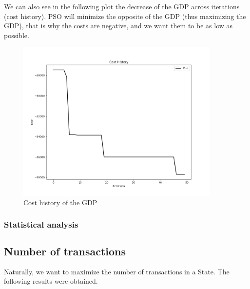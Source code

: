         We can also see in the following plot the decrease of the GDP across iterations (cost history). PSO will minimize the opposite of the GDP (thus maximizing the GDP), that is why the costs are negative, and we want them to be as low as possible.

        \begin{figure}[H]
            \centering
            \includegraphics[width=0.9\textwidth]{img/opti/costHistoryGDP.png}
            \caption{Cost history of the GDP}
        \end{figure}

        \subsubsection{Statistical analysis}

    \subsection{Number of transactions}

        Naturally, we want to maximize the number of transactions in a State. The following results were obtained.
    
